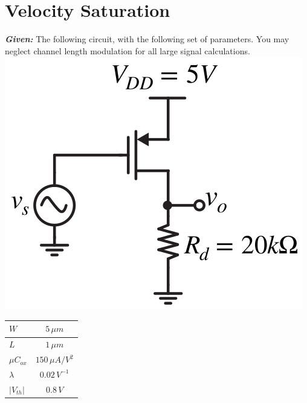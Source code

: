 \documentclass[12pt, fleqn]{article}
\begin{document}
\newpage
\section{Velocity Saturation}
\textbf{\emph{Given: }} The following circuit, with the following set of parameters.  You may neglect channel length modulation for all large signal calculations.\\[0.25cm]
    \includegraphics[scale=0.45, center]{p3.png}\\
    \begin{table}[H]
    \centering
    \setlength{\tabcolsep}{20pt}
    \renewcommand{\arraystretch}{1.5}
        \begin{tabular}{|l|c|}
            \hline
            $W$ & $5\,\mu m$\\
            \hline
            $L$ & $1\,\mu m$\\
            \hline
            $\mu C_{ox}$ & $150\,\mu A/V^2$\\
            \hline
            $\lambda$ & $0.02\,V^{-1}$\\
            \hline
            $\left|V_{th}\right|$ & $0.8\,V$\\
            \hline
        \end{tabular}
    \end{table}
\end{document}
